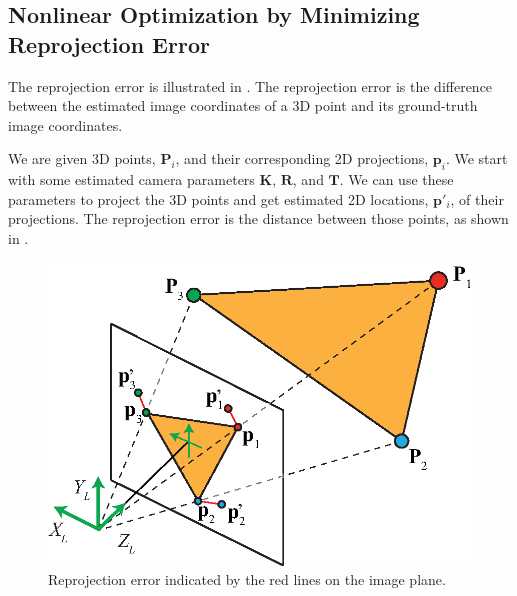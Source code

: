 \subsection{Nonlinear Optimization by Minimizing Reprojection Error}
\label{sec:cam_cal_minimizing_reprojection_error}

The reprojection error is illustrated in \fig{\ref{fig:reprojection_error}}.
The reprojection error is the difference between the estimated image coordinates of a 3D point and its ground-truth image coordinates.  

We are given 3D points, $\mathbf{P}_i$, and their corresponding 2D projections, $\mathbf{p}_i$. We start with some estimated camera parameters $\mathbf{K}$, $\mathbf{R}$, and $\mathbf{T}$. We can use these parameters to project the 3D points and get estimated 2D locations, $\mathbf{p}'_i$, of their projections. The reprojection error is the distance between those points, as shown in \fig{\ref{fig:reprojection_error}}. 

\begin{figure}[t]
\centerline{
\includegraphics[width=.6\linewidth]{figures/imaging_geometry/reprojection_error.eps}
}
\caption{Reprojection error indicated by the red lines on the image plane.}
\label{fig:reprojection_error}
\end{figure}

